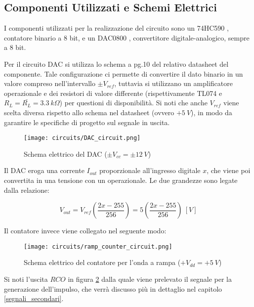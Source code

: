 \subsection*{Componenti Utilizzati e Schemi Elettrici}


I componenti utilizzati per la realizzazione del circuito sono un 74HC590 \cite{74hc590},
contatore binario a 8 bit, e un DAC0800 \cite{dac0800}, convertitore digitale-analogico, sempre
a 8 bit.

Per il circuito DAC si utilizza lo schema a pg.10 del relativo datasheet del componente.
Tale configurazione ci permette di convertire il dato binario in un valore compreso
nell'intervallo $\pm V_{ref}$, tuttavia si utilizzano un amplificatore operazionale e dei
resistori di valore differente (rispettivamente TL074 \cite{tl074} e $R_L=\bar{R_L}=3.3\ k\Omega$)
per questioni di disponibilità. Si noti che anche $V_{ref}$ viene scelta diversa rispetto
allo schema nel datasheet (ovvero $+5\ V$), in modo da garantire le specifiche di progetto
sul segnale in uscita.

\begin{figure}[H]
    \centering
    \texttt{[image: circuits/DAC\_circuit.png]}
    \caption{Schema elettrico del DAC ($\pm V_{cc}=\pm 12\ V$)}
    \label{DAC_circuit}
\end{figure}

Il DAC eroga una corrente $I_{out}$ proporzionale all'ingresso digitale $x$, che viene poi
convertita in una tensione con un operazionale. Le due grandezze sono legate dalla relazione:

\begin{equation}\label{vout_dac}
    V_{out}=V_{ref}\left(\frac{2x-255}{256}\right)=5\left(\frac{2x-255}{256}\right)\ [V]
\end{equation}

Il contatore invece viene collegato nel seguente modo:

\begin{figure}[H]
    \centering
    \texttt{[image: circuits/ramp\_counter\_circuit.png]}
    \caption{Schema elettrico del contatore per l'onda a rampa ($+V_{dd}=+5\ V$)}
    \label{ramp_counter_circuit}
\end{figure}

Si noti l'uscita $RCO$ in figura \ref{ramp_counter_circuit} dalla quale viene prelevato
il segnale per la generazione dell'impulso, che verrà discusso più in dettaglio nel capitolo
\ref{segnali_secondari}.

